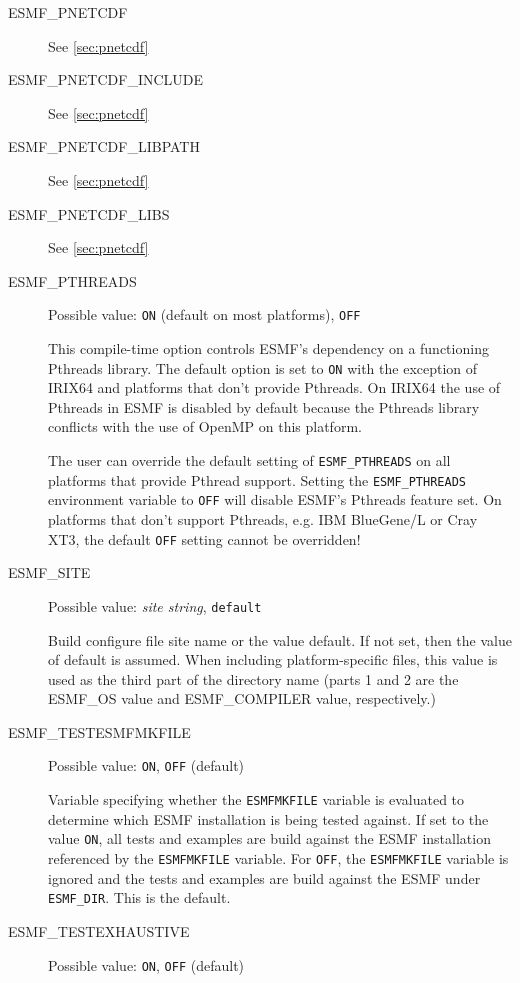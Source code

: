 \begin{description}
\item[ESMF\_PNETCDF]
See \ref{sec:pnetcdf}

\item[ESMF\_PNETCDF\_INCLUDE]
See \ref{sec:pnetcdf}

\item[ESMF\_PNETCDF\_LIBPATH]
See \ref{sec:pnetcdf}

\item[ESMF\_PNETCDF\_LIBS]
See \ref{sec:pnetcdf}

\item[ESMF\_PTHREADS]
Possible value: {\tt ON} (default on most platforms), {\tt OFF}

This compile-time option controls ESMF's dependency on a functioning
Pthreads library. The default option is set to {\tt ON} with the exception
of IRIX64 and platforms that don't provide Pthreads. On IRIX64 the use of
Pthreads in ESMF is disabled by default because the Pthreads library conflicts
with the use of OpenMP on this platform.

The user can override the default setting of {\tt ESMF\_PTHREADS} on all
platforms that provide Pthread support. Setting the {\tt ESMF\_PTHREADS}
environment variable to {\tt OFF} will disable ESMF's Pthreads feature set.
On platforms that don't support Pthreads, e.g. IBM BlueGene/L or Cray XT3, the
default {\tt OFF} setting cannot be overridden!

\item[ESMF\_SITE]
Possible value: {\em site string}, {\tt default}

Build configure file site name or the value default. If not set, then the value
of default is assumed. When including platform-specific files, this value is
used as the third part of the directory name (parts 1 and 2 are the
ESMF\_OS value and ESMF\_COMPILER value, respectively.)

\item[ESMF\_TESTESMFMKFILE]
Possible value: {\tt ON}, {\tt OFF} (default)

Variable specifying whether the {\tt ESMFMKFILE} variable is evaluated to
determine which ESMF installation is being tested against. If set to the
value {\tt ON}, all tests and examples are build against the ESMF installation
referenced by the {\tt ESMFMKFILE} variable. For {\tt OFF}, the
{\tt ESMFMKFILE} variable is ignored and the tests and examples are build
against the ESMF under {\tt ESMF\_DIR}. This is the default.

\item[ESMF\_TESTEXHAUSTIVE]
Possible value: {\tt ON}, {\tt OFF} (default)


\end{description}
